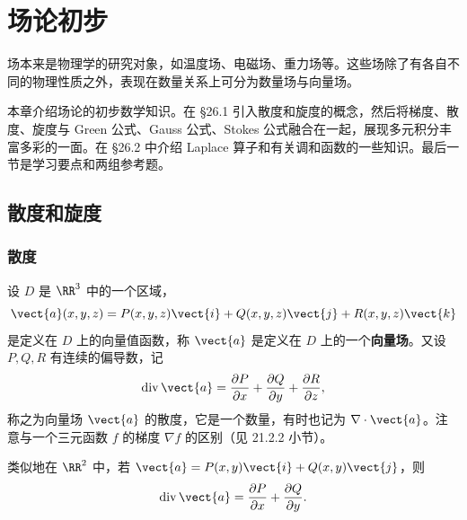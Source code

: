 \chapter{场论初步}


场本来是物理学的研究对象，如温度场、电磁场、重力场等。这些场除了有各自不同的物理性质之外，表现在数量关系上可分为数量场与向量场。

本章介绍场论的初步数学知识。在 §26.1 引入散度和旋度的概念，然后将梯度、散度、旋度与 Green 公式、Gauss 公式、Stokes 公式融合在一起，展现多元积分丰富多彩的一面。在 §26.2 中介绍 Laplace 算子和有关调和函数的一些知识。最后一节是学习要点和两组参考题。

\section{散度和旋度}

\subsection{散度}

设 $D$ 是 $\RR^3$ 中的一个区域，
\[
  \vect{a}(x,y,z)=P(x,y,z)\vect{i}+Q(x,y,z)\vect{j}+R(x,y,z)\vect{k}
\]
是定义在 $D$ 上的向量值函数，称 $\vect{a}$ 是定义在 $D$ 上的一个\textbf{向量场}。又设 $P,Q,R$ 有连续的偏导数，记
\[
  \operatorname{div}\vect{a}
  =\frac{\partial P}{\partial x}+\frac{\partial Q}{\partial y}+\frac{\partial R}{\partial z},
\]
称之为向量场 $\vect{a}$ 的散度，它是一个数量，有时也记为 $\nabla\cdot\vect{a}$。注意与一个三元函数 $f$ 的梯度 $\nabla f$ 的区别（见 21.2.2 小节）。

类似地在 $\RR^2$ 中，若 $\vect{a}=P(x,y)\vect{i}+Q(x,y)\vect{j}$，则
\[
  \operatorname{div}\vect{a}=\frac{\partial P}{\partial x}+\frac{\partial Q}{\partial y}.
\]

